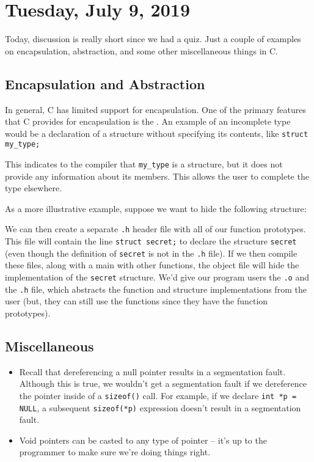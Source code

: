 \section{Tuesday, July 9, 2019}
Today, discussion is really short since we had a quiz. Just a couple of examples on encapsulation, abstraction, and some other miscellaneous things in C.


\subsection{Encapsulation and Abstraction}

In general, C has limited support for encapsulation. One of the primary features that C provides for encapsulation is the . An example of an incomplete type would be a declaration of a structure without specifying its contents, like \verb!struct my_type;!

This indicates to the compiler that \verb!my_type! is a structure, but it does not provide any information about its members. This allows the user to complete the type elsewhere. 

As a more illustrative example, suppose we want to hide the following structure:


\lstset{
caption=Secret Structure
}
\begin{center}

\end{center}

We can then create a separate \verb!.h! header file with all of our function prototypes. This file will contain the line \verb!struct secret;! to declare the structure \verb!secret! (even though the definition of \verb!secret! is not in the \verb!.h! file).  If we then compile these files, along with a main with other functions, the object file will hide the implementation of the \verb!secret! structure. We'd give our program users the \verb!.o! and the \verb!.h! file, which abstracts the function and structure implementations from the user (but, they can still use the functions since they have the function prototypes).




\subsection{Miscellaneous}

\begin{itemize}
    \item Recall that dereferencing a null pointer results in a segmentation fault. Although this is true, we wouldn't get a segmentation fault if we dereference the pointer inside of a \verb!sizeof()! call. For example, if we declare \verb!int *p = NULL!, a subsequent \verb!sizeof(*p)! expression doesn't result in a segmentation fault.
    \item Void pointers can be casted to any type of pointer -- it's up to the programmer to make sure we're doing things right.
\end{itemize}

